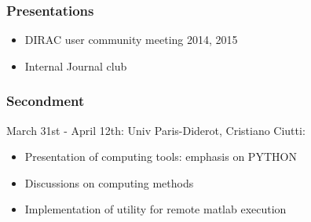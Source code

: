 \documentclass[14pt]{beamer}
\begin{document}
\begin{frame}
\frametitle{Presentations}
\begin{itemize}
\item DIRAC user community meeting 2014, 2015
\item Internal Journal club
\end{itemize}
\end{frame}

\begin{frame}
\frametitle{Secondment}
March 31st - April 12th: Univ Paris-Diderot, Cristiano Ciutti:
\begin{itemize}
\item Presentation of computing tools: emphasis on PYTHON
\item Discussions on computing methods
\item Implementation of utility for remote matlab execution
\end{itemize}
\end{frame}
\end{document}
